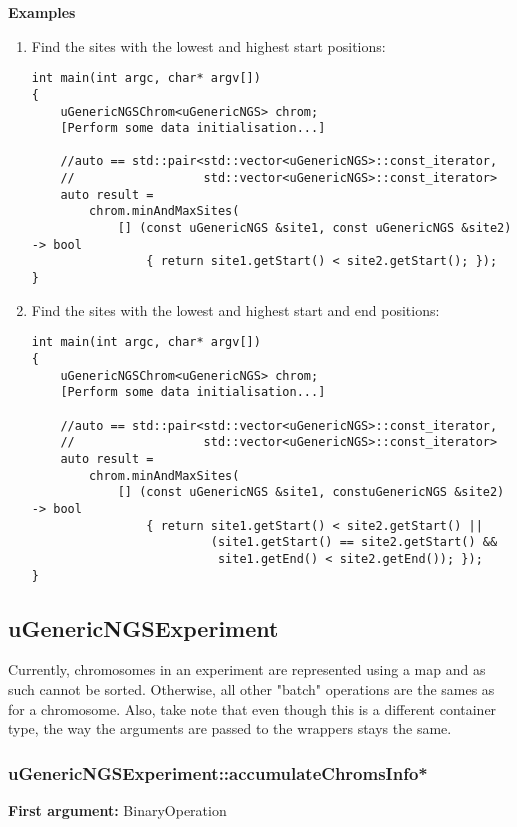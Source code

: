 \documentclass[letterpaper,10pt]{article}
\begin{document}
\bigskip
\noindent{}\textbf{Examples}
\begin{enumerate}
 \item Find the sites with the lowest and highest start positions:
\begin{verbatim}
int main(int argc, char* argv[])
{
    uGenericNGSChrom<uGenericNGS> chrom;
    [Perform some data initialisation...]

    //auto == std::pair<std::vector<uGenericNGS>::const_iterator,
    //                  std::vector<uGenericNGS>::const_iterator>
    auto result = 
        chrom.minAndMaxSites(
            [] (const uGenericNGS &site1, const uGenericNGS &site2) -> bool
                { return site1.getStart() < site2.getStart(); });
}
\end{verbatim}

 \item Find the sites with the lowest and highest start and end positions:
\begin{verbatim}
int main(int argc, char* argv[])
{
    uGenericNGSChrom<uGenericNGS> chrom;
    [Perform some data initialisation...]

    //auto == std::pair<std::vector<uGenericNGS>::const_iterator,
    //                  std::vector<uGenericNGS>::const_iterator>
    auto result = 
        chrom.minAndMaxSites(
            [] (const uGenericNGS &site1, constuGenericNGS &site2) -> bool
                { return site1.getStart() < site2.getStart() || 
                         (site1.getStart() == site2.getStart() && 
                          site1.getEnd() < site2.getEnd()); });
}
\end{verbatim}
\end{enumerate}

\subsection{uGenericNGSExperiment}
Currently, chromosomes in an experiment are represented using a map and as such cannot be sorted. Otherwise, all other "batch" operations are the sames as for a chromosome. Also, take note that even though this is a different container type, the way the arguments are passed to the wrappers stays the same.

\subsubsection{uGenericNGSExperiment::accumulateChromsInfo*}
\textbf{First argument:} BinaryOperation
\end{document}
